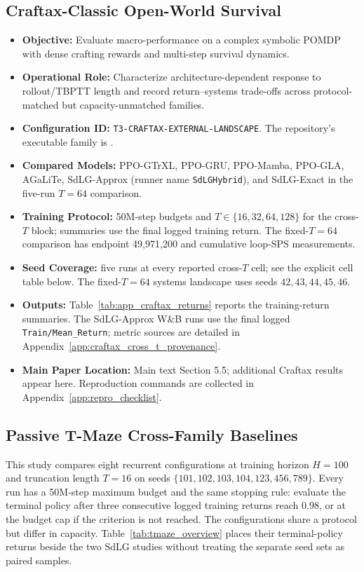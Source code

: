 \subsection{Craftax-Classic Open-World Survival}
\begin{itemize}
    \item \textbf{Objective:} Evaluate macro-performance on a complex symbolic POMDP with dense crafting rewards and multi-step survival dynamics.
    \item \textbf{Operational Role:} Characterize architecture-dependent response to rollout/TBPTT length and record return--systems trade-offs across protocol-matched but capacity-unmatched families.
    \item \textbf{Configuration ID:} \texttt{T3-CRAFTAX-EXTERNAL-LANDSCAPE}. The repository's executable family is .
    \item \textbf{Compared Models:} PPO-GTrXL, PPO-GRU, PPO-Mamba, PPO-GLA, AGaLiTe, SdLG-Approx (runner name \texttt{SdLGHybrid}), and SdLG-Exact in the five-run $T=64$ comparison.
    \item \textbf{Training Protocol:} 50M-step budgets and $T\in\{16,32,64,128\}$ for the cross-$T$ block; summaries use the final logged training return. The fixed-$T=64$ comparison has endpoint 49,971,200 and cumulative loop-SPS measurements.
    \item \textbf{Seed Coverage:} five runs at every reported cross-$T$ cell; see the explicit cell table below. The fixed-$T=64$ systems landscape uses seeds $42,43,44,45,46$.
    \item \textbf{Outputs:} Table~\ref{tab:app_craftax_returns} reports the training-return summaries. The SdLG-Approx W\&B runs use the final logged \texttt{Train/Mean\_Return}; metric sources are detailed in Appendix~\ref{app:craftax_cross_t_provenance}.
    \item \textbf{Main Paper Location:} Main text Section 5.5; additional Craftax results appear here. Reproduction commands are collected in Appendix~\ref{app:repro_checklist}.
\end{itemize}

\subsection{Passive T-Maze Cross-Family Baselines}
\label{app:tmaze_external_landscape}

This study compares eight recurrent configurations at training horizon $H=100$ and truncation length $T=16$ on seeds $\{101,102,103,104,123,456,789\}$. Every run has a 50M-step maximum budget and the same stopping rule: evaluate the terminal policy after three consecutive logged training returns reach $0.98$, or at the budget cap if the criterion is not reached. The configurations share a protocol but differ in capacity. Table~\ref{tab:tmaze_overview} places their terminal-policy returns beside the two SdLG studies without treating the separate seed sets as paired samples.


